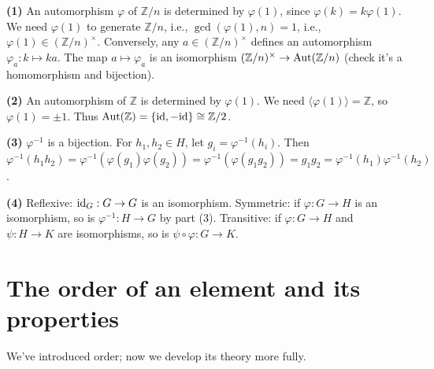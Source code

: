 \documentclass{report}
\begin{document}
\begin{solution}
\textbf{(1)} An automorphism \(\varphi\) of \(\mathbb{Z}/n\) is determined by \(\varphi(1)\), since \(\varphi(k) = k\varphi(1)\). We need \(\varphi(1)\) to generate \(\mathbb{Z}/n\), i.e., \(\gcd(\varphi(1), n) = 1\), i.e., \(\varphi(1) \in (\mathbb{Z}/n)^\times\). Conversely, any \(a \in (\mathbb{Z}/n)^\times\) defines an automorphism \(\varphi_a : k \mapsto ka\). The map \(a \mapsto \varphi_a\) is an isomorphism \((\mathbb{Z}/n)^\times \to \operatorname{Aut}(\mathbb{Z}/n)\) (check it's a homomorphism and bijection).

\textbf{(2)} An automorphism of \(\mathbb{Z}\) is determined by \(\varphi(1)\). We need \(\langle \varphi(1) \rangle = \mathbb{Z}\), so \(\varphi(1) = \pm 1\). Thus \(\operatorname{Aut}(\mathbb{Z}) = \{\text{id}, -\text{id}\} \cong \mathbb{Z}/2\).

\textbf{(3)} \(\varphi^{-1}\) is a bijection. For \(h_1, h_2 \in H\), let \(g_i = \varphi^{-1}(h_i)\). Then \(\varphi^{-1}(h_1 h_2) = \varphi^{-1}(\varphi(g_1)\varphi(g_2)) = \varphi^{-1}(\varphi(g_1 g_2)) = g_1 g_2 = \varphi^{-1}(h_1)\varphi^{-1}(h_2)\).

\textbf{(4)} Reflexive: \(\text{id}_G : G \to G\) is an isomorphism. Symmetric: if \(\varphi : G \to H\) is an isomorphism, so is \(\varphi^{-1} : H \to G\) by part (3). Transitive: if \(\varphi : G \to H\) and \(\psi : H \to K\) are isomorphisms, so is \(\psi \circ \varphi : G \to K\).
\end{solution}

\section{The order of an element and its properties}

We've introduced order; now we develop its theory more fully.


\end{document}
